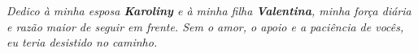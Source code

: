 \documentclass[12pt, %
openright, 
oneside, %
a4paper,    %
brazil]{facom-ufu-abntex2}
\begin{document}
\frenchspacing 

\imprimircapa
\imprimirfolhaderosto


%
%
\begin{folhadeaprovacao}

  \begin{center}
    {\ABNTEXchapterfont\large\imprimirautor}

    \vspace*{\fill}\vspace*{\fill}
    {\ABNTEXchapterfont\bfseries\Large\imprimirtitulo}
    \vspace*{\fill}
    
    \hspace{.45\textwidth}
    \begin{minipage}{.5\textwidth}
        \imprimirpreambulo
    \end{minipage}%
    \vspace*{\fill}
   \end{center}
    

      
   \begin{center}
    \vspace*{0.5cm}
    {\large\imprimirlocal}
    \par
    {\large\imprimirdata}
    \vspace*{1cm}
  \end{center}
  
\end{folhadeaprovacao}



\begin{dedicatoria}
   \vspace*{\fill}
   \centering
   \noindent
   \textit{Dedico à minha esposa \textbf{Karoliny} e à minha filha \textbf{Valentina}, minha força diária e razão maior de seguir em frente. Sem o amor, o apoio e a paciência de vocês, eu teria desistido no caminho.}
   \vspace*{\fill}
\end{dedicatoria}
\end{document}
